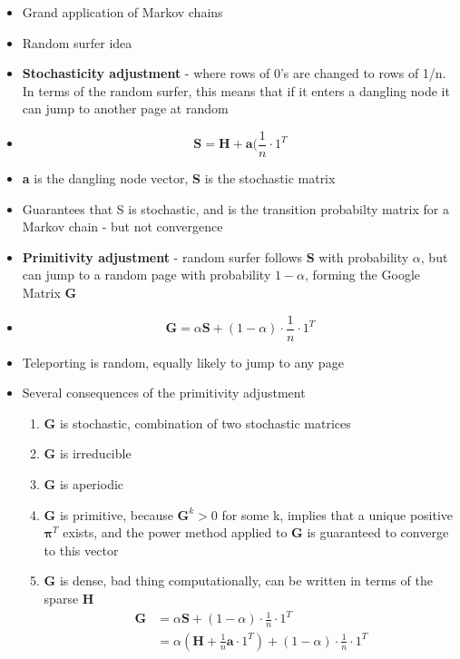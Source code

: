 \documentclass[11pt]{report}
\begin{document}
\begin{itemize}
\item Grand application of Markov chains
\item Random surfer idea
\item \textbf{Stochasticity adjustment} - where rows of 0’s are changed to rows of 1/n. In terms of the random surfer, this means that if it enters a dangling node it can jump to another page at random 
\item \begin{equation}
\textbf{S} = \textbf{H} + \textbf{a}(\frac{1}{n}\cdot 1^{T}
\end{equation}
\item \textbf{a} is the dangling node vector, \textbf{S} is the stochastic matrix
\item Guarantees that S is stochastic, and is the transition probabilty matrix for a Markov chain - but not convergence
\item \textbf{Primitivity adjustment} - random surfer follows \textbf{S} with probability \(\alpha\), but can jump to a random page with probability \(1-\alpha\), forming the Google Matrix \textbf{G}
\item \begin{equation}
\textbf{G} = \alpha\textbf{S} + (1-\alpha)\cdot\frac{1}{n}\cdot 1^{T}
\end{equation}
\item Teleporting is random, equally likely to jump to any page
\item Several consequences of the primitivity adjustment
\begin{enumerate}
\item \textbf{G} is stochastic, combination of two stochastic matrices
\item \textbf{G} is irreducible
\item \textbf{G} is aperiodic
\item \textbf{G} is primitive, because \(\textbf{G}^k>0\) for some k, implies that a unique positive \(\boldsymbol{\pi}^T\) exists, and the power method applied to \textbf{G} is guaranteed to converge to this vector
\item \textbf{G} is dense, bad thing computationally, can be written in terms of the sparse \textbf{H}
\begin{equation}
\begin{split}
\textbf{G} &= \alpha\textbf{S} + (1-\alpha)\cdot\frac{1}{n}\cdot 1^{T}\\
&= \alpha(\textbf{H} +\frac{1}{n}\textbf{a}\cdot1^{T}) + (1-\alpha)\cdot\frac{1}{n}\cdot1^T \\

\end{split}
\end{equation}
\end{enumerate}
\end{itemize}
\end{document}
